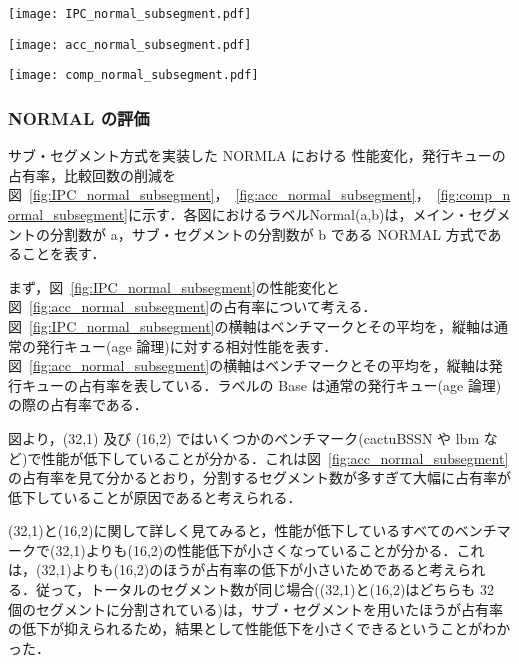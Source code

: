 \documentclass[twocolumn]{jsarticle}
\begin{document}
  \begin{figure*}[ht]
    \centering
    \texttt{[image: IPC\_normal\_subsegment.pdf]}
    \caption{サブ・セグメントによる性能変化(NORMAL)}
    \label{fig:IPC_normal_subsegment}
  \end{figure*}

  \begin{figure*}[ht]
    \centering
    \texttt{[image: acc\_normal\_subsegment.pdf]}
    \caption{サブ・セグメントによる IQ 占有率の変化(NORMAL)}
    \label{fig:acc_normal_subsegment}
  \end{figure*}

  \begin{figure*}[ht]
    \centering
    \texttt{[image: comp\_normal\_subsegment.pdf]}
    \caption{サブ・セグメントによる比較回数削減率(NORMAL)}
    \label{fig:comp_normal_subsegment}
  \end{figure*}


  \subsubsection{NORMAL の評価}
  サブ・セグメント方式を実装した NORMLA における 性能変化，発行キューの占有率，比較回数の削減を図~\ref{fig:IPC_normal_subsegment}，~\ref{fig:acc_normal_subsegment}，~\ref{fig:comp_normal_subsegment}に示す．各図におけるラベルNormal(a,b)は，メイン・セグメントの分割数が a，サブ・セグメントの分割数が b である NORMAL 方式であることを表す．
  
  まず，図~\ref{fig:IPC_normal_subsegment}の性能変化と図~\ref{fig:acc_normal_subsegment}の占有率について考える．図~\ref{fig:IPC_normal_subsegment}の横軸はベンチマークとその平均を，縦軸は通常の発行キュー(age 論理)に対する相対性能を表す．図~\ref{fig:acc_normal_subsegment}の横軸はベンチマークとその平均を，縦軸は発行キューの占有率を表している．ラベルの Base は通常の発行キュー(age 論理)の際の占有率である．
  
  図より，(32,1) 及び (16,2) ではいくつかのベンチマーク(cactuBSSN や lbm など)で性能が低下していることが分かる．これは図~\ref{fig:acc_normal_subsegment}の占有率を見て分かるとおり，分割するセグメント数が多すぎて大幅に占有率が低下していることが原因であると考えられる．

  (32,1)と(16,2)に関して詳しく見てみると，性能が低下しているすべてのベンチマークで(32,1)よりも(16,2)の性能低下が小さくなっていることが分かる．これは，(32,1)よりも(16,2)のほうが占有率の低下が小さいためであると考えられる．従って，トータルのセグメント数が同じ場合((32,1)と(16,2)はどちらも 32 個のセグメントに分割されている)は，サブ・セグメントを用いたほうが占有率の低下が抑えられるため，結果として性能低下を小さくできるということがわかった．
  
\end{document}
